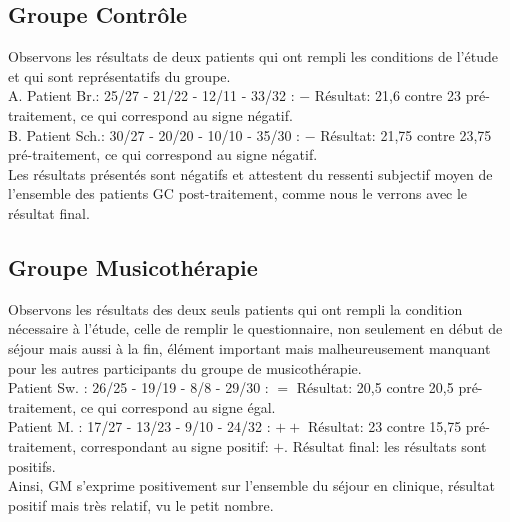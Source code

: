    \subsection{Groupe Contrôle}
   Observons les résultats de deux patients qui ont rempli les conditions de 
   l'étude et qui sont représentatifs du groupe. 
   \\
   	A. Patient Br.:  25/27 - 21/22 - 12/11 - 33/32 : $-$
   	Résultat: 21,6 contre 23 pré-traitement,  ce qui
   	correspond au signe négatif.
   	\\
   	B. Patient Sch.: 30/27 - 20/20 -  10/10 - 35/30 :  $-$
   	Résultat: 21,75 contre 23,75 pré-traitement, ce qui
   	correspond au signe négatif.
   	\\
   Les résultats présentés sont  négatifs 
   et attestent du ressenti subjectif moyen de l'ensemble des patients
   GC post-traitement,  comme nous le verrons avec  le résultat final.
   
\subsection {Groupe Musicothérapie}
Observons  les résultats des deux seuls patients  qui ont rempli  la condition nécessaire à 
l'étude, celle de remplir le questionnaire, non seulement en début de séjour mais aussi à la fin,
élément important mais malheureusement manquant pour les autres 
participants du groupe de musicothérapie.
 \\
 	Patient Sw. : 26/25 - 19/19 - 8/8 - 29/30 :   $=$
 	Résultat: 20,5 contre 20,5 pré-traitement, ce qui
 	correspond au signe égal.
 	\\
 	Patient M. : 17/27 - 13/23 -  9/10 - 24/32 :  $++$
 	Résultat: 23 contre 15,75 pré-traitement, correspondant au signe positif: $+$.
 Résultat final: les résultats sont positifs.
 	\\
 Ainsi,  GM s'exprime
 positivement
 sur l'ensemble du séjour en clinique, résultat positif mais très relatif, vu le petit nombre.

